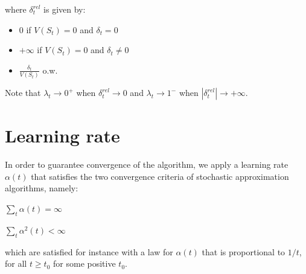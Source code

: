 \documentclass[11pt,A4paper]{article}
\begin{document}
where $\delta^{rel}_t$ is given by:  

\begin{itemize}
\item $0$ if $V(S_t) = 0$ and $\delta_t = 0$  
\item $+\infty$ if $V(S_t) = 0$ and $\delta_t \neq 0$  
\item $\frac{\delta_t}{V(S_t)}$ o.w.  
\end{itemize}

Note that $\lambda_t \to 0^+$ when $\delta^{rel}_t \to 0$ and $\lambda_t \to 1^-$ when $|\delta^{rel}_t| \to +\infty$.






\section{Learning rate}

In order to guarantee convergence of the algorithm, we apply a learning rate $\alpha(t)$ that satisfies the two convergence criteria of stochastic approximation algorithms, namely:

$\sum_{t} \alpha(t) = \infty$

$\sum_{t} \alpha^2(t) < \infty$

which are satisfied for instance with a law for $\alpha(t)$ that is proportional to $1/t$, for all $t \geq t_0$ for some positive $t_0$.
\end{document}
